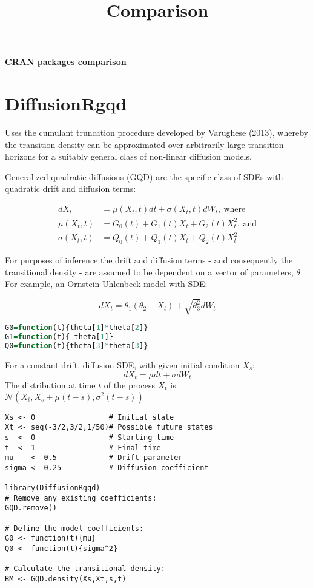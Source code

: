 \documentclass[a4paper,11pt]{article}
\begin{document}
\pagestyle{empty}
\title{Comparison}
\begin{center}
\Large\textbf{CRAN packages comparison} \\[11pt]
\normalsize
\end{center}

\section{DiffusionRgqd}
Uses the cumulant truncation procedure developed by Varughese (2013), whereby the transition density can be approximated over arbitrarily large transition horizons for a suitably general class of non-linear diffusion models.

Generalized quadratic diffusions (GQD) are the specific class of SDEs with quadratic drift and diffusion terms:

\begin{align*}
d X_t & = \mu(X_t, t)dt + \sigma(X_t, t)dW_t, \: \text{where} \\
\mu(X_t, t) & = G_0(t) + G_1(t) X_t + G_2(t) X_t^2, \: \text{and} \\
\sigma (X_t, t) & = Q_0(t) + Q_1(t) X_t + Q_2(t) X_t^2
\end{align*}

For purposes of inference the drift and diffusion terms - and consequently the transitional density - are assumed to be dependent on a vector of parameters, $\theta$. For example, an Ornstein-Uhlenbeck model with SDE:

\begin{equation}
d X_t = \theta_1 (\theta_2 - X_t) + \sqrt{\theta_3^2} dW_t
\end{equation}

\begin{lstlisting}[language=R]
G0=function(t){theta[1]*theta[2]}
G1=function(t){-theta[1]}
Q0=function(t){theta[3]*theta[3]}
\end{lstlisting}

For a constant drift, diffusion SDE, with given initial condition $X_s$:
\begin{equation}
dX_t = \mu dt + \sigma dW_t
\end{equation}
The distribution at time $t$ of the process $X_t$ is $\mathcal{N}(X_t, X_s + \mu(t-s), \sigma^2(t-s))$

\begin{lstlisting}
Xs <- 0                 # Initial state
Xt <- seq(-3/2,3/2,1/50)# Possible future states
s  <- 0                 # Starting time
t  <- 1                 # Final time
mu    <- 0.5            # Drift parameter
sigma <- 0.25           # Diffusion coefficient

library(DiffusionRgqd) 
# Remove any existing coefficients:
GQD.remove()

# Define the model coefficients:
G0 <- function(t){mu}
Q0 <- function(t){sigma^2}

# Calculate the transitional density:
BM <- GQD.density(Xs,Xt,s,t)
\end{lstlisting}
\end{document}
